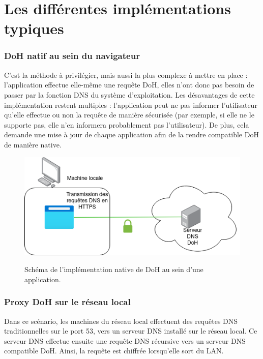 \documentclass[a4paper,12pt]{article}
\begin{document}
	\section{Les différentes implémentations typiques}
	
	\subsubsection{DoH natif au sein du navigateur}
	
	C'est la méthode à privilégier, mais aussi la plus complexe à mettre en place : l'application effectue elle-même une requête DoH, elles n'ont donc pas besoin de passer par la fonction DNS du système d'exploitation. Les désavantages de cette implémentation restent multiples : l'application peut ne pas informer l'utilisateur qu'elle effectue ou non la requête de manière sécurisée (par exemple, si elle ne le supporte pas, elle n'en informera probablement pas l'utilisateur). De plus, cela demande une mise à jour de chaque application afin de la rendre compatible DoH de manière native.
	
	\begin{figure}[H]
		\begin{center}
			{\includegraphics[scale=0.6]{Images/schema_doh_native.png}}
		\end{center}
		\caption{Schéma de l'implémentation native de DoH au sein d'une application.}
	\end{figure}
	 
	
	\subsubsection{Proxy DoH sur le réseau local}
	
	Dans ce scénario, les machines du réseau local effectuent des requêtes DNS traditionnelles sur le port 53, vers un serveur DNS installé sur le réseau local. Ce serveur DNS effectue ensuite une requête DNS récursive vers un serveur DNS compatible DoH. Ainsi, la requête est chiffrée lorsqu'elle sort du LAN.
	
\end{document}
